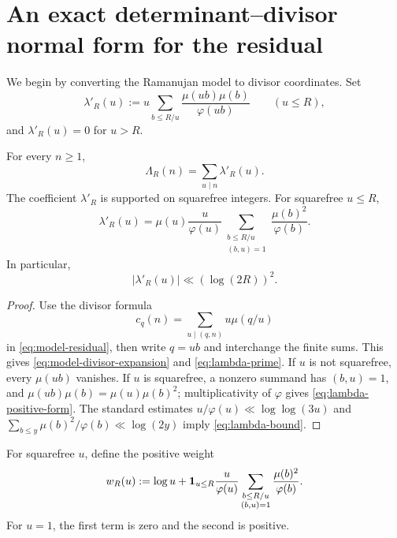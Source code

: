 \section{An exact determinant--divisor normal form for the residual}
\label{sec:divisor-normal}

We begin by converting the Ramanujan model to divisor coordinates.  Set
\begin{equation}
 \lambda'_R(u)
 :=u\sum_{b\le R/u}\frac{\mu(ub)\mu(b)}{\varphi(ub)}
 \qquad (u\le R),
 \label{eq:lambda-prime}
\end{equation}
and \(\lambda'_R(u)=0\) for \(u>R\).

\begin{lemma}
\label{lem:lambda-divisor}
For every \(n\ge1\),
\begin{equation}
 \Lambda_R(n)=\sum_{u\mid n}\lambda'_R(u).
 \label{eq:model-divisor-expansion}
\end{equation}
The coefficient \(\lambda'_R\) is supported on squarefree integers.
For squarefree \(u\le R\),
\begin{equation}
 \lambda'_R(u)
 =\mu(u)\frac{u}{\varphi(u)}
 \sum_{\substack{b\le R/u\\(b,u)=1}}
 \frac{\mu(b)^2}{\varphi(b)}.
 \label{eq:lambda-positive-form}
\end{equation}
In particular,
\begin{equation}
 |\lambda'_R(u)|\ll (\log(2R))^2.
 \label{eq:lambda-bound}
\end{equation}
\end{lemma}

\begin{proof}
Use the divisor formula
\[
 c_q(n)=\sum_{u\mid(q,n)}u\mu(q/u)
\]
in \eqref{eq:model-residual}, then write \(q=ub\) and interchange the
finite sums.  This gives \eqref{eq:model-divisor-expansion} and
\eqref{eq:lambda-prime}.  If \(u\) is not squarefree, every
\(\mu(ub)\) vanishes.  If \(u\) is squarefree, a nonzero summand has
\((b,u)=1\), and
\(\mu(ub)\mu(b)=\mu(u)\mu(b)^2\); multiplicativity of \(\varphi\)
gives \eqref{eq:lambda-positive-form}.  The standard estimates
\(u/\varphi(u)\ll\log\log(3u)\) and
\(\sum_{b\le y}\mu(b)^2/\varphi(b)\ll\log(2y)\) imply
\eqref{eq:lambda-bound}.
\end{proof}

For squarefree \(u\), define the positive weight
\begin{equation}
 w_R(u)
 :=\log u+\mathbf 1_{u\le R}\frac{u}{\varphi(u)}
 \sum_{\substack{b\le R/u\\(b,u)=1}}
 \frac{\mu(b)^2}{\varphi(b)}.
 \label{eq:wR}
\end{equation}
For \(u=1\), the first term is zero and the second is positive.


